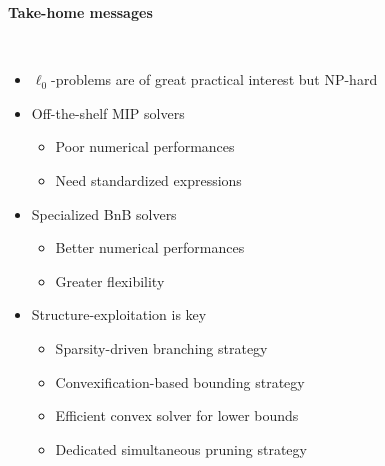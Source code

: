 \begin{frame}
    \begin{center}
        \Large{\textbf{Take-home messages}}
    \end{center}
    ~\\
    \begin{itemize}[label=\textbullet]
        \item $\ell_0$-problems are of great practical interest but NP-hard
        \item Off-the-shelf MIP solvers
        \begin{itemize}
            \item[\textcolor{TolLightRed}{\ding{55}}] Poor numerical performances
            \item[\textcolor{TolLightRed}{\ding{55}}] Need standardized expressions
        \end{itemize}
        \item Specialized BnB solvers
        \begin{itemize}
            \item[\textcolor{TolLightGreen}{\ding{51}}] Better numerical performances
            \item[\textcolor{TolLightGreen}{\ding{51}}] Greater flexibility
        \end{itemize}
        \item Structure-exploitation is key
        \begin{itemize}[label=$\rightarrow$]
            \item Sparsity-driven branching strategy
            \item Convexification-based bounding strategy
            \item Efficient convex solver for lower bounds
            \item Dedicated simultaneous pruning strategy
        \end{itemize}
    \end{itemize}
\end{frame}